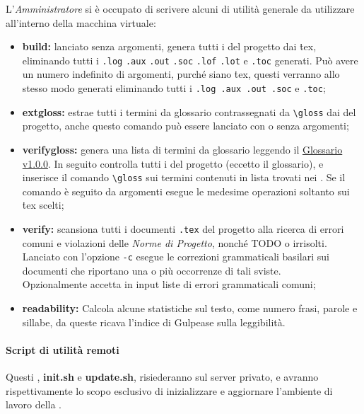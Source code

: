 \documentclass{scalatekids-article}
\begin{document}
\label{sec:script}
L'\textit{Amministratore} si è occupato di scrivere alcuni  di utilità
generale da utilizzare all'interno della macchina virtuale:
\begin{itemize}
    \item\textbf{build:} lanciato senza argomenti, genera tutti i  del
        progetto dai \.tex, eliminando tutti i  \verb=.log= \verb=.aux= \verb=.out= \verb=.soc=
        \verb=.lof= \verb=.lot= e \verb=.toc=
        generati. Può avere un numero indefinito di argomenti, purché siano
         \.tex,
        questi verranno allo stesso modo generati eliminando tutti i 
        \verb=.log .aux .out .soc= e \verb=.toc=;
    \item\textbf{extgloss:} estrae tutti i termini da glossario contrassegnati da
        \verb=\gloss= dai  del progetto, anche questo comando può essere lanciato con
        o senza argomenti;
    \item\textbf{verifygloss:} genera una lista di termini da glossario leggendo il
         \href{run:../RR/Esterni/Glossario\_v1.0.0.pdf}{Glossario v1.0.0}. In seguito controlla tutti i  del
        progetto (eccetto il glossario), e inserisce il comando \verb=\gloss= sui termini
        contenuti in lista trovati nei . Se il comando è seguito da argomenti esegue le medesime
        operazioni soltanto sui  \.tex scelti;
    \item\textbf{verify:} scansiona tutti i documenti \verb=.tex= del progetto alla
        ricerca di errori comuni e violazioni delle \textit{Norme di Progetto}, nonché
        TODO o  irrisolti. Lanciato con l'opzione \verb=-c=
        esegue le correzioni grammaticali basilari sui documenti che riportano una o
        più occorrenze di tali sviste.\\
        Opzionalmente accetta in input liste di errori grammaticali comuni;
    \item\textbf{readability:} Calcola alcune statistiche sul testo, come numero
        frasi, parole e sillabe, da queste ricava l'indice di Gulpease sulla
        leggibilità.
\end{itemize}

\paragraph{Script di utilità remoti}

Questi , \textbf{init.sh} e \textbf{update.sh}, risiederanno sul server
privato, e avranno rispettivamente lo scopo esclusivo di inizializzare e
aggiornare l'ambiente di lavoro della .
\end{document}
